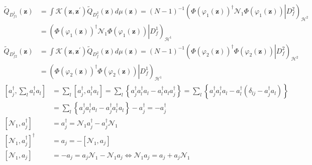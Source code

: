 \documentclass[aps,preprint]{revtex4}%
\begin{document}
\begin{align}
\tilde{Q}_{D_{f1}^{1}}\left(  \mathbf{z}\right)   &  =\int\mathcal{K}\left(
\mathbf{z,z}^{\prime}\right)  \tilde{Q}_{D_{f}^{2}}\left(  \mathbf{z}\right)
d\mu\left(  \mathbf{z}\right)  =\left(  N-1\right)  ^{-1}\left(  \left.
\Phi\left(  \varphi_{1}\left(  \mathbf{z}\right)  \right)  ^{\dagger
}\mathcal{N}_{1}\Phi\left(  \varphi_{1}\left(  \mathbf{z}\right)  \right)
\right\vert D_{f}^{2}\right)  _{\mathcal{H}^{2}}\nonumber\\
&  =\left(  \left.  \Phi\left(  \varphi_{1}\left(  \mathbf{z}\right)  \right)
^{\dagger}\mathcal{N}_{1}\Phi\left(  \varphi_{1}\left(  \mathbf{z}\right)
\right)  \right\vert D_{f}^{1}\right)  _{\mathcal{H}^{1}}%
\end{align}%
\begin{align}
\tilde{Q}_{D_{f2}^{1}}\left(  \mathbf{z}\right)   &  =\int\mathcal{K}\left(
\mathbf{z,z}^{\prime}\right)  \tilde{Q}_{D_{f}^{2}}\left(  \mathbf{z}\right)
d\mu\left(  \mathbf{z}\right)  =\left(  N-1\right)  ^{-1}\left(  \left.
\Phi\left(  \varphi_{2}\left(  \mathbf{z}\right)  \right)  ^{\dagger}%
\Phi\left(  \varphi_{2}\left(  \mathbf{z}\right)  \right)  \right\vert
D_{f}^{2}\right)  _{\mathcal{H}^{2}}\nonumber\\
&  =\left(  \left.  \Phi\left(  \varphi_{2}\left(  \mathbf{z}\right)  \right)
^{\dagger}\Phi\left(  \varphi_{2}\left(  \mathbf{z}\right)  \right)
\right\vert D_{f}^{1}\right)  _{\mathcal{H}^{1}}%
\end{align}%
\begin{align}
\left[  a_{j}^{\dagger},\sum_{l}a_{l}^{\dagger}a_{l}\right]   &  =\sum
_{l}\left[  a_{j}^{\dagger},a_{l}^{\dagger}a_{l}\right]  =\sum_{l}\left\{
a_{j}^{\dagger}a_{l}^{\dagger}a_{l}-a_{l}^{\dagger}a_{l}a_{j}^{\dagger
}\right\}  =\sum_{l}\left\{  a_{j}^{\dagger}a_{l}^{\dagger}a_{l}%
-a_{l}^{\dagger}\left(  \delta_{lj}-a_{j}^{\dagger}a_{l}\right)  \right\}
\nonumber\\
&  =\sum_{l}\left\{  a_{j}^{\dagger}a_{l}^{\dagger}a_{l}-a_{j}^{\dagger}%
a_{l}^{\dagger}a_{l}\right\}  -a_{j}^{\dagger}=-a_{j}^{\dagger}\nonumber\\
\left[  \mathcal{N}_{1},a_{j}^{\dagger}\right]   &  =a_{j}^{\dagger
}=\mathcal{N}_{1}a_{j}^{\dagger}-a_{j}^{\dagger}\mathcal{N}_{1}\nonumber\\
\left[  \mathcal{N}_{1},a_{j}^{\dagger}\right]  ^{\dagger}  &  =a_{j}=-\left[
\mathcal{N}_{1},a_{j}\right] \nonumber\\
\left[  \mathcal{N}_{1},a_{j}\right]   &  =-a_{j}=a_{j}\mathcal{N}%
_{1}-\mathcal{N}_{1}a_{j}\Leftrightarrow\mathcal{N}_{1}a_{j}=a_{j}%
+a_{j}\mathcal{N}_{1}%
\end{align}%
\end{document}
